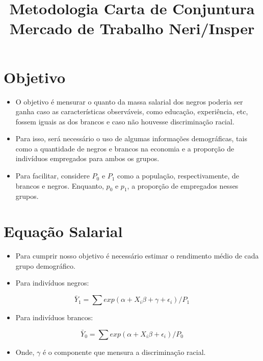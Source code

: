 \documentclass{article}
\title{Metodologia Carta de Conjuntura Mercado de Trabalho Neri/Insper}
\begin{document}
	\maketitle
	
\section{Objetivo}
\begin{itemize}
	\item O objetivo é mensurar o quanto da massa salarial dos negros poderia ser ganha caso as características observáveis, como educação, experiência, etc, fossem iguais as dos brancos e caso não houvesse discriminação racial.
	\item Para isso, será necessário o uso de algumas informações demográficas, tais como a quantidade de negros e brancos na economia e a proporção de indivíduos empregados para ambos os grupos.
	\item Para facilitar, considere $P_{0}$ e $P_{1}$ como a população, respectivamente, de brancos e negros. Enquanto, $p_{0}$ e $p_{1}$, a proporção de empregados nesses grupos.
\end{itemize}	
	
\section{Equação Salarial}	
\begin{itemize}
	\item Para cumprir nosso objetivo é necessário estimar o rendimento médio de cada grupo demográfico.
	\item Para indivíduos negros:
	\end{itemize}
	
	\begin{equation}
		\bar{Y}_{1} = \sum exp(\alpha + X_{i}\beta + \gamma + \epsilon_{i})/P_{1} 
	\end{equation}
	
\begin{itemize}
	\item Para indivíduos brancos:
\end{itemize}
	
	\begin{equation}
		\bar{Y}_{0} = \sum exp(\alpha + X_{i}\beta + \epsilon_{i})/P_{0} 
	\end{equation}
	
\begin{itemize}
	\item Onde, $\gamma$ é o componente que mensura a discriminação racial.
\end{itemize}
\end{document}
